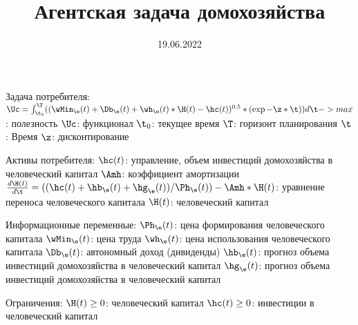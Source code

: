 \documentclass[12pt]{article}
\title{Агентская задача домохозяйства}
\date{19.06.2022}
\begin{document}
Задача потребителя:
    $\Uc = \int_{\t_{0}}^\T ((\wMin_{\e}(t)+\Db_{\e}(t)+\wh_{\e}(t)*\H(t)-\hc(t))^{0.5}*(\exp{-\z*\t}))d\t -> max$: полезность
    $\Uc$: функционал
    $\t_{0}$: текущее время
    $\T$: горизонт планирования
    $\t$: Время
    $\z$: дисконтирование

Активы потребителя:
    $\hc(t)$: управление, объем инвестиций домохозяйства в человеческий капитал
    $\Amh$: коэффициент амортизации
    $\frac{d\H(t)}{d\t} = ((\hc(t)+\hb_{\e}(t)+\hg_{\e}(t))/\Ph_{\e}(t))-\Amh*\H(t)$: уравнение переноса человеческого капитала
    $\H(t)$: человеческий капитал

Информационные переменные:
    $\Ph_{\e}(t)$: цена формирования человеческого капитала
    $\wMin_{\e}(t)$: цена труда
    $\wh_{\e}(t)$: цена использования человеческого капитала
    $\Db_{\e}(t)$: автономный доход (дивиденды)
    $\hb_{\e}(t)$: прогноз объема инвестиций домохозяйства в человеческий капитал
    $\hg_{\e}(t)$: прогноз объема инвестиций домохозяйства в человеческий капитал

Ограничения:
    $\H(t)\geq 0$: человеческий капитал
    $\hc(t)\geq 0$: инвестиции в человеческий капитал
\end{document}
